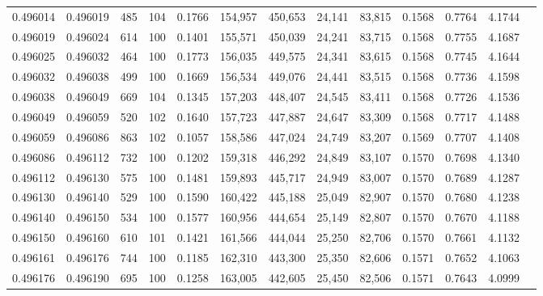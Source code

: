 \begin{tabular}{rrrrrrrrrrrrr}
0.496014 & 0.496019 &   485 & 104 &                                     0.1766 & 154,957 & 450,653 &  24,141 &  83,815 & 0.1568 & 0.7764 & 4.1744 \\
0.496019 & 0.496024 &   614 & 100 &                                     0.1401 & 155,571 & 450,039 &  24,241 &  83,715 & 0.1568 & 0.7755 & 4.1687 \\
0.496025 & 0.496032 &   464 & 100 &                                     0.1773 & 156,035 & 449,575 &  24,341 &  83,615 & 0.1568 & 0.7745 & 4.1644 \\
0.496032 & 0.496038 &   499 & 100 &                                     0.1669 & 156,534 & 449,076 &  24,441 &  83,515 & 0.1568 & 0.7736 & 4.1598 \\
0.496038 & 0.496049 &   669 & 104 &                                     0.1345 & 157,203 & 448,407 &  24,545 &  83,411 & 0.1568 & 0.7726 & 4.1536 \\
0.496049 & 0.496059 &   520 & 102 &                                     0.1640 & 157,723 & 447,887 &  24,647 &  83,309 & 0.1568 & 0.7717 & 4.1488 \\
0.496059 & 0.496086 &   863 & 102 &                                     0.1057 & 158,586 & 447,024 &  24,749 &  83,207 & 0.1569 & 0.7707 & 4.1408 \\
0.496086 & 0.496112 &   732 & 100 &                                     0.1202 & 159,318 & 446,292 &  24,849 &  83,107 & 0.1570 & 0.7698 & 4.1340 \\
0.496112 & 0.496130 &   575 & 100 &                                     0.1481 & 159,893 & 445,717 &  24,949 &  83,007 & 0.1570 & 0.7689 & 4.1287 \\
0.496130 & 0.496140 &   529 & 100 &                                     0.1590 & 160,422 & 445,188 &  25,049 &  82,907 & 0.1570 & 0.7680 & 4.1238 \\
0.496140 & 0.496150 &   534 & 100 &                                     0.1577 & 160,956 & 444,654 &  25,149 &  82,807 & 0.1570 & 0.7670 & 4.1188 \\
0.496150 & 0.496160 &   610 & 101 &                                     0.1421 & 161,566 & 444,044 &  25,250 &  82,706 & 0.1570 & 0.7661 & 4.1132 \\
0.496161 & 0.496176 &   744 & 100 &                                     0.1185 & 162,310 & 443,300 &  25,350 &  82,606 & 0.1571 & 0.7652 & 4.1063 \\
0.496176 & 0.496190 &   695 & 100 &                                     0.1258 & 163,005 & 442,605 &  25,450 &  82,506 & 0.1571 & 0.7643 & 4.0999 \\

\end{tabular}
